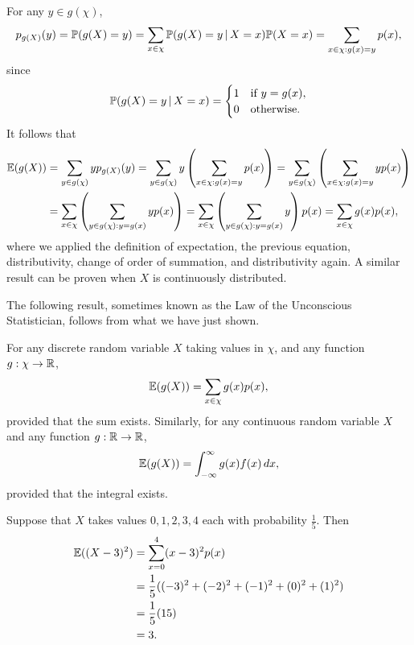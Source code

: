 \documentclass[10pt, a4paper]{article}
\begin{document}
For any $y \in g(\chi)$,
\[
p_{g(X)}(y) = \P(g(X) = y) = \sum_{x \in \chi}\P(g(X) = y\,|\,X = x)\P(X = x) = \sum_{x \in \chi:g(x) = y}p(x),
\]
since
\[
\P(g(X) = y\,|\,X = x) = \begin{cases}
    1 &\text{if } y = g(x), \\
    0 &\text{otherwise}.
\end{cases}
\]
It follows that
\begin{align*}
    \E(g(X)) &= \sum_{y \in g(\chi)}yp_{g(X)}(y)
    = \sum_{y \in g(\chi)}y\left(\sum_{x \in \chi: g(x) = y}p(x)\right)
    = \sum_{y \in g(\chi)}\left(\sum_{x \in \chi : g(x) = y}yp(x)\right) \\
    &= \sum_{x \in \chi}\left(\sum_{y \in g(\chi) : y = g(x)}yp(x)\right)
    = \sum_{x \in \chi}\left(\sum_{y \in g(\chi) : y = g(x)}y\right)p(x)
    = \sum_{x \in \chi}g(x)p(x),
\end{align*}
where we applied the definition of expectation,
the previous equation,
distributivity, change of order of summation, and distributivity again.
A similar result can be proven when $X$ is continuously distributed.

The following result, sometimes known as the Law of the Unconscious Statistician, follows from what we have just shown.
\begin{theorem}\label{pre:prob:thm:lawofunconsciousstatistician}
    For any discrete random variable $X$ taking values in $\chi$,
    and any function $g : \chi \rightarrow \R$,
    \begin{equation}
        \E(g(X)) = \sum_{x \in \chi}g(x)p(x),
    \end{equation}
    provided that the sum exists.
    Similarly,
    for any continuous random variable $X$ and any function $g : \R \rightarrow \R$,
    \begin{equation}
        \E(g(X)) = \int_{-\infty}^{\infty}g(x)f(x)\,dx,
    \end{equation}
    provided that the integral exists.
\end{theorem}

\begin{example}
    Suppose that $X$ takes values $0, 1, 2, 3, 4$ each with probability $\frac{1}{5}$.
    Then
    \begin{align*}
        \E((X - 3) ^ 2) &= \sum_{x = 0}^{4}(x - 3) ^ 2p(x) \\
        &= \frac{1}{5}((-3) ^ 2 + (-2) ^ 2 + (-1) ^ 2 + (0) ^ 2 + (1) ^ 2) \\
        &= \frac{1}{5}(15) \\
        &= 3.
    \end{align*}
\end{example}
\end{document}
